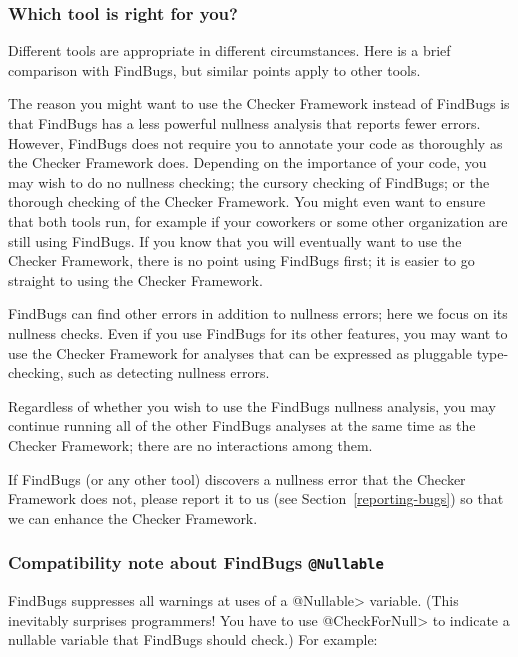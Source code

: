 \subsubsection{Which tool is right for you?\label{choosing-nullness-tool}}

Different tools are appropriate in different circumstances.  Here is a
brief comparison with FindBugs, but similar points apply to other tools.

The reason you might want to use the Checker Framework instead of FindBugs
is that FindBugs has a less powerful nullness analysis that reports fewer
errors.  However, FindBugs does not require you to annotate your code as
thoroughly as the Checker Framework does.  Depending on the importance of
your code, you may wish to do no nullness checking; the cursory checking of
FindBugs; or the thorough checking of the Checker Framework.  You might
even want to ensure that both tools run, for example if your coworkers or
some other organization are still using FindBugs.  If you know that you
will eventually want to use the Checker Framework, there is no point using
FindBugs first; it is easier to go straight to using the Checker Framework.

FindBugs can find other errors in addition to nullness errors; here
we focus on its nullness checks.  Even if you use FindBugs for its other
features, you may want to use the Checker Framework for analyses that can
be expressed as pluggable type-checking, such as detecting nullness errors.

Regardless of whether you wish to use the FindBugs nullness analysis, you
may continue running all of the other FindBugs analyses at the same time as
the Checker Framework; there are no interactions among them.

If FindBugs (or any other tool) discovers a nullness error that the Checker
Framework does not, please report it to us (see
Section~\ref{reporting-bugs}) so that we can enhance the Checker Framework.



\subsubsection{Compatibility note about FindBugs \tt{@Nullable}\label{findbugs-nullable}}

FindBugs suppresses all warnings at uses of a \<@Nullable> variable.  (This
inevitably surprises programmers!  You have to use \<@CheckForNull> to
indicate a nullable variable that FindBugs should check.)  For example:

